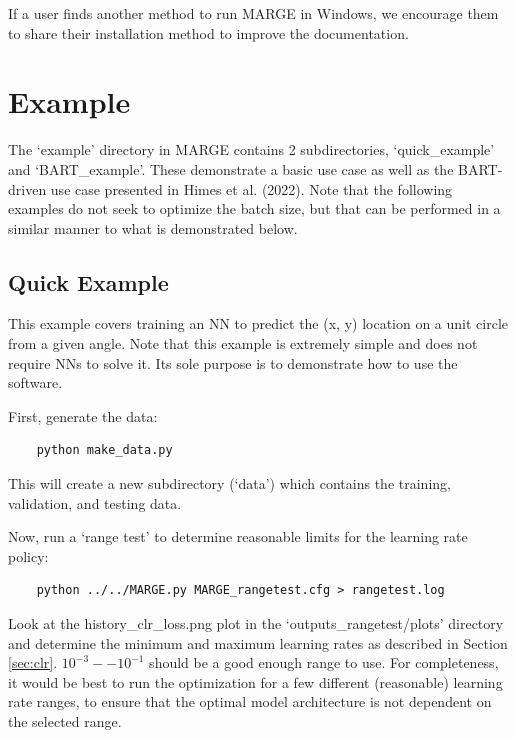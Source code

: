 \documentclass[letterpaper, 12pt]{article}
\begin{document}
\noindent If a user finds another method to run MARGE in Windows, 
we encourage them to share their installation method to improve the 
documentation.


\section{Example}
\label{sec:example}

\noindent The `example' directory in MARGE contains 2 subdirectories, 
`quick\_example' and `BART\_example'.  These demonstrate a basic use 
case as well as the BART-driven use case presented in Himes et al. (2022).
Note that the following examples do not seek to optimize the batch size, 
but that can be performed in a similar manner to what is demonstrated below.

\subsection{Quick Example}

\noindent This example covers training an NN to predict the (x, y) location on a 
unit circle from a given angle.  Note that this example is extremely simple and 
does not require NNs to solve it.  Its sole purpose is to demonstrate how to 
use the software.\newline

\noindent First, generate the data:
\begin{verbatim}
	python make_data.py
\end{verbatim}
\noindent This will create a new subdirectory (`data') which contains the 
training, validation, and testing data.\newline

\noindent Now, run a `range test' to determine reasonable limits for 
the learning rate policy:
\begin{verbatim}
	python ../../MARGE.py MARGE_rangetest.cfg > rangetest.log
\end{verbatim}
\noindent Look at the history\_clr\_loss.png plot in the `outputs\_rangetest/plots' 
directory and determine the minimum and maximum learning rates as described in 
Section \ref{sec:clr}.  $10^{-3} -- 10^{-1}$ should be a good enough range to use. 
For completeness, it would be best to run the optimization for a few different 
(reasonable) learning rate ranges, to ensure that the optimal model architecture 
is not dependent on the selected range. \newline
\end{document}
